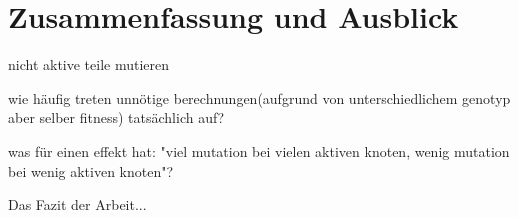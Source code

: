 \chapter{Zusammenfassung und Ausblick}



nicht aktive teile mutieren


wie häufig treten unnötige berechnungen(aufgrund von unterschiedlichem genotyp aber selber fitness) tatsächlich auf?


was für einen effekt hat: "viel mutation bei vielen aktiven knoten, wenig mutation bei wenig aktiven knoten"?


\label{cha:fazit}

Das Fazit der Arbeit...

